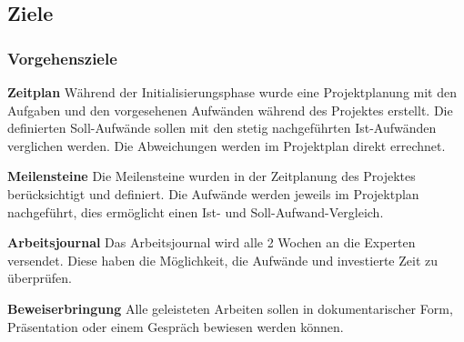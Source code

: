 \subsection{Ziele}
\subsubsection{Vorgehensziele}

\textbf{Zeitplan}
\newline
Während der Initialisierungsphase wurde eine Projektplanung mit den Aufgaben und den vorgesehenen Aufwänden während des Projektes erstellt. Die definierten Soll-Aufwände sollen mit den stetig nachgeführten Ist-Aufwänden verglichen werden. Die Abweichungen werden im Projektplan direkt errechnet.

\textbf{Meilensteine}
\newline
Die Meilensteine wurden in der Zeitplanung des Projektes berücksichtigt und definiert. Die Aufwände werden jeweils im Projektplan nachgeführt, dies ermöglicht einen Ist- und Soll-Aufwand-Vergleich.

\textbf{Arbeitsjournal}
\newline
Das Arbeitsjournal wird alle 2 Wochen an die Experten versendet. Diese haben die Möglichkeit, die Aufwände und investierte Zeit zu überprüfen.

\textbf{Beweiserbringung}
\newline
Alle geleisteten Arbeiten sollen in dokumentarischer Form, Präsentation oder einem Gespräch bewiesen werden können.